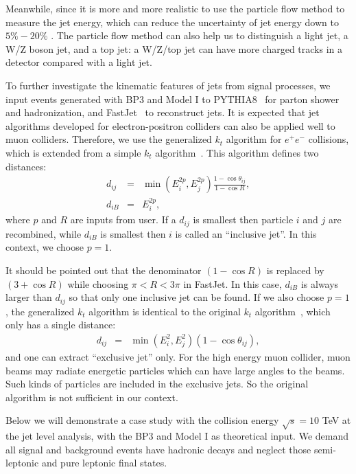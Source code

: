 \documentclass[a4paper,11pt]{article}
\begin{document}
Meanwhile, since it is more and more realistic to use the particle flow method to measure the jet energy, 
which can reduce the uncertainty of jet energy down to $5\%-20\%$ \cite{Nachman:2022emq}. 
 The particle flow method can also help us to distinguish a light jet, 
a W/Z boson jet, and a top jet: a W/Z/top jet can have more charged tracks in a detector compared with a light jet.

To further investigate the kinematic features of jets from signal processes, 
we input events generated with BP3 and Model I to PYTHIA8~\cite{Bierlich:2022pfr} for parton shower and hadronization, 
and FastJet~\cite{Cacciari:2011ma} to reconstruct jets.  
It is expected that jet algorithms developed for electron-positron colliders can also be applied well to muon colliders. 
Therefore, we use the generalized $k_t$ algorithm for $e^+e^-$ collisions,
which is extended from a simple $k_t$ algorithm~\cite{Catani:1991hj}.
This algorithm defines two distances:
\begin{eqnarray}
  d_{ij} &=& \min(E^{2p}_i,E^{2p}_j)\frac{1-\cos\theta_{ij}}{1-\cos{R}}, \label{eq:genkt1}\\
  d_{iB} &=& E^{2p}_i, \label{eq:genkt2}
\end{eqnarray}
where $p$ and $R$ are inputs from user. 
If a $d_{ij}$ is smallest then particle $i$ and $j$ are recombined, 
while $d_{iB}$ is smallest then $i$ is called an ``inclusive jet''.
In this context, we choose $p=1$.

It should be pointed out that the denominator $(1-\cos{R})$ is replaced by $(3+\cos{R})$ while choosing $\pi<R<3\pi$ in FastJet.
In this case, $d_{iB}$ is always larger than $d_{ij}$ so that only one inclusive jet can be found.  
If we also choose $p=1$, the generalized $k_t$ algorithm is identical to the original $k_t$ algorithm~\cite{Catani:1991hj}, 
which only has a single distance:
\begin{eqnarray}
  d_{ij} &=& \min(E^{2}_i,E^{2}_j)\left(1-\cos\theta_{ij}\right), \label{eq:eekt}
\end{eqnarray}
and one can extract ``exclusive jet'' only. 
For the high energy muon collider, muon beams may radiate energetic particles which can have large angles to the beams. 
Such kinds of particles are included in the exclusive jets. 
So the original algorithm is not sufficient in our context.

Below we will demonstrate a case study with the collision energy $\sqrt{s}=10$ TeV at the jet level analysis, 
with the BP3 and Model I as theoretical input. 
We demand all signal and background events have hadronic decays and neglect those semi-leptonic and pure leptonic final states. 
\end{document}
